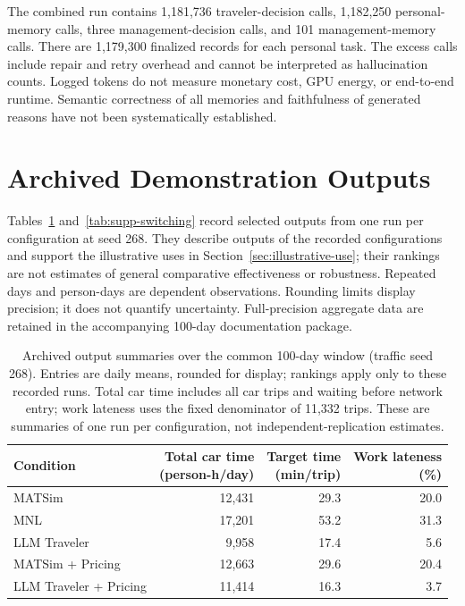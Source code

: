 The combined run contains 1,181,736 traveler-decision calls, 1,182,250 personal-memory calls, three management-decision calls, and 101 management-memory calls. There are 1,179,300 finalized records for each personal task. The excess calls include repair and retry overhead and cannot be interpreted as hallucination counts. Logged tokens do not measure monetary cost, GPU energy, or end-to-end runtime. Semantic correctness of all memories and faithfulness of generated reasons have not been systematically established.

\section{Archived Demonstration Outputs}
\label{app:supplementary}

Tables~\ref{tab:validation-outcomes} and~\ref{tab:supp-switching} record selected outputs from one run per configuration at seed 268. They describe outputs of the recorded configurations and support the illustrative uses in Section~\ref{sec:illustrative-use}; their rankings are not estimates of general comparative effectiveness or robustness. Repeated days and person-days are dependent observations. Rounding limits display precision; it does not quantify uncertainty. Full-precision aggregate data are retained in the accompanying 100-day documentation package.

\begin{table}[htbp]
    \centering
    \small
    \caption{Archived output summaries over the common 100-day window (traffic seed 268). Entries are daily means, rounded for display; rankings apply only to these recorded runs. Total car time includes all car trips and waiting before network entry; work lateness uses the fixed denominator of 11,332 trips. These are summaries of one run per configuration, not independent-replication estimates.}
    \label{tab:validation-outcomes}
    \renewcommand{\arraystretch}{1.15}
    \begin{tabularx}{\linewidth}{@{}>{\raggedright\arraybackslash}X r r r@{}}
        \toprule
        Condition & \shortstack{Total car time\\(person-h/day)} & \shortstack{Target time\\(min/trip)} & \shortstack{Work lateness\\(\%)} \\
        \midrule
        MATSim & 12,431 & 29.3 & 20.0 \\
        MNL & 17,201 & 53.2 & 31.3 \\
        LLM Traveler & 9,958 & 17.4 & 5.6 \\
        MATSim + Pricing & 12,663 & 29.6 & 20.4 \\
        LLM Traveler + Pricing & 11,414 & 16.3 & 3.7 \\
        \bottomrule
    \end{tabularx}
\end{table}

